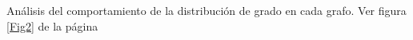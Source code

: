 \documentclass{article}
\begin{document}
Análisis del comportamiento de la distribución de grado en cada grafo. Ver figura \ref{Fig2} de la página \pageref{Fig2} 

\begin{figure}[htbp]

\end{figure}
\end{document}
